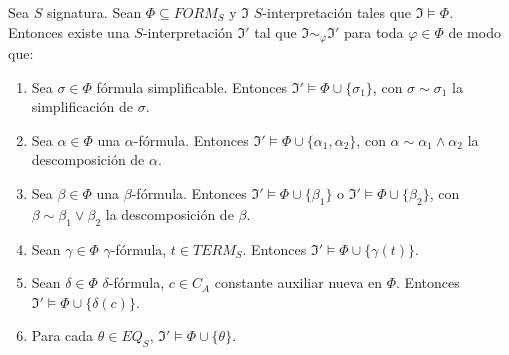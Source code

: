 \begin{prop}\label{aaa}
Sea $S$ signatura. Sean $\Phi \subseteq FORM_S$ y $\mathfrak{I}$ $S$-interpretación tales que $\mathfrak{I} \vDash \Phi$. Entonces existe una $S$-interpretación $\mathfrak{I}'$ tal que $\mathfrak{I} \sim_{\varphi} \mathfrak{I}'$ para toda $\varphi \in \Phi$ de modo que:
\begin{enumerate}
    \item Sea $\sigma \in \Phi$ fórmula simplificable. Entonces $\mathfrak{I}' \vDash \Phi \cup \{\sigma_1 \}$, con $\sigma \sim \sigma_1$ la simplificación de $\sigma$.
    \item Sea $\alpha \in \Phi$ una $\alpha$-fórmula. Entonces $\mathfrak{I}' \vDash \Phi \cup \{\alpha_1, \alpha_2 \}$, con $\alpha \sim \alpha_1 \land \alpha_2$ la descomposición de $\alpha$.
    \item Sea $\beta \in \Phi$ una $\beta$-fórmula. Entonces $\mathfrak{I}' \vDash \Phi \cup \{\beta_1\}$ o $\mathfrak{I}' \vDash \Phi \cup \{\beta_2\}$, con $\beta \sim \beta_1 \lor \beta_2$ la descomposición de $\beta$.
    \item Sean $\gamma \in \Phi$ $\gamma$-fórmula, $t \in TERM_S$. Entonces $\mathfrak{I}' \vDash \Phi \cup \{\gamma(t)\}$.
    \item Sean $\delta \in \Phi$ $\delta$-fórmula, $c \in C_A$ constante auxiliar nueva en $\Phi$. Entonces $\mathfrak{I}' \vDash \Phi \cup \{\delta(c)\}$.
    \item Para cada $\theta \in EQ_S$, $\mathfrak{I}' \vDash \Phi \cup \{ \theta\}$.
\end{enumerate}
\end{prop}
